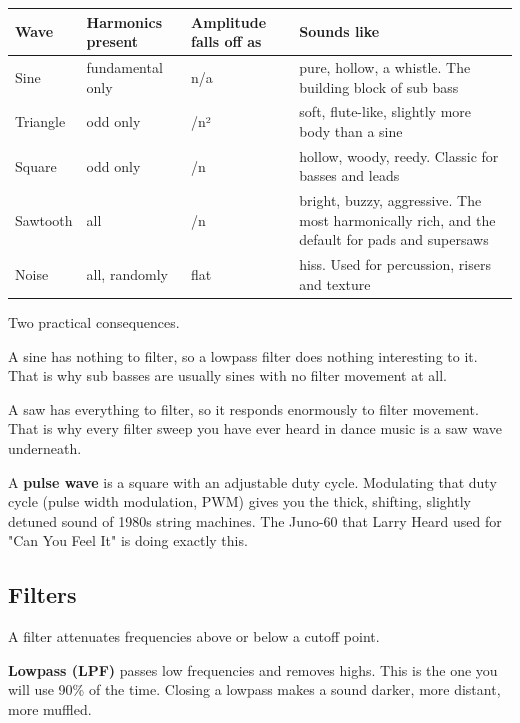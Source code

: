 {\def\LTcaptype{none} %
\begin{longtable}[]{@{}>{\raggedright\arraybackslash}p{}>{\raggedright\arraybackslash}p{}>{\raggedright\arraybackslash}p{}>{\raggedright\arraybackslash}p{}@{}}
\toprule\noalign{}
Wave & Harmonics present & Amplitude falls off as & Sounds like \\
\midrule\noalign{}
\endhead
\bottomrule\noalign{}
\endlastfoot
Sine & fundamental only & n/a & pure, hollow, a whistle. The building block of sub bass \\
Triangle & odd only & 1/n² & soft, flute-like, slightly more body than a sine \\
Square & odd only & 1/n & hollow, woody, reedy. Classic for basses and leads \\
Sawtooth & all & 1/n & bright, buzzy, aggressive. The most harmonically rich, and the default for pads and supersaws \\
Noise & all, randomly & flat & hiss. Used for percussion, risers and texture \\
\end{longtable}
}

Two practical consequences.

A sine has nothing to filter, so a lowpass filter does nothing interesting to it. That is
why sub basses are usually sines with no filter movement at all.

A saw has everything to filter, so it responds enormously to filter movement. That is why
every filter sweep you have ever heard in dance music is a saw wave underneath.

A \textbf{pulse wave} is a square with an adjustable duty cycle. Modulating that duty cycle
(pulse width modulation, PWM) gives you the thick, shifting, slightly detuned sound of
1980s string machines. The Juno-60 that Larry Heard used for "Can You Feel It" is doing
exactly this.

\subsection{Filters}\label{th05_sound_design-filters}

A filter attenuates frequencies above or below a cutoff point.

\textbf{Lowpass (LPF)} passes low frequencies and removes highs. This is the one you will use 90\%
of the time. Closing a lowpass makes a sound darker, more distant, more muffled.

